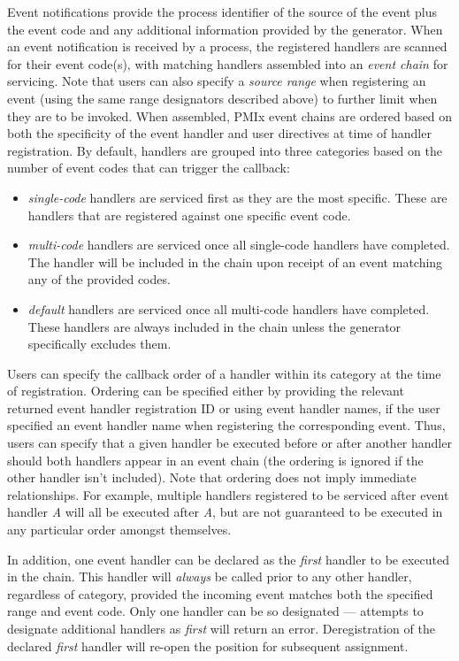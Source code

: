 Event notifications provide the process identifier of the source of the event plus the event code and any additional information provided by the generator. When an event notification is received by a process, the registered handlers are scanned for their event code(s), with matching handlers assembled into an \textit{event chain} for servicing. Note that users can also specify a \textit{source range} when registering an event (using the same range designators described above) to further limit when they are to be invoked. When assembled, PMIx event chains are ordered based on both the specificity of the event handler and user directives at time of handler registration. By default, handlers are grouped into three categories based on the number of event codes that can trigger the callback:
\begin{itemize}
\item \textit{single-code} handlers are serviced first as they are the most specific. These are handlers that are registered against one specific event code.

\item \textit{multi-code} handlers are serviced once all single-code handlers have completed. The handler will be included in the chain upon receipt of an event matching any of the provided codes.

\item \textit{default} handlers are serviced once all multi-code handlers have completed. These handlers are always included in the chain unless the generator specifically excludes them.
\end{itemize}

Users can specify the callback order of a handler within its category at the time of registration. Ordering can be specified either by providing the relevant returned event handler registration ID or using event handler names, if the user specified an event handler name when registering the corresponding event. Thus, users can specify that a given handler be executed before or after another handler should both handlers appear in an event chain (the ordering is ignored if the other handler isn't included). Note that ordering does not imply immediate relationships. For example, multiple handlers registered to be serviced after event handler \textit{A} will all be executed after \textit{A}, but are not guaranteed to be executed in any particular order amongst themselves.

In addition, one event handler can be declared as the \textit{first} handler to be executed in the chain. This handler will \textit{always} be called prior to any other handler, regardless of category, provided the incoming event matches both the specified range and event code. Only one handler can be so designated --- attempts to designate additional handlers as \textit{first} will return an error. Deregistration of the declared \textit{first} handler will re-open the position for subsequent assignment.


